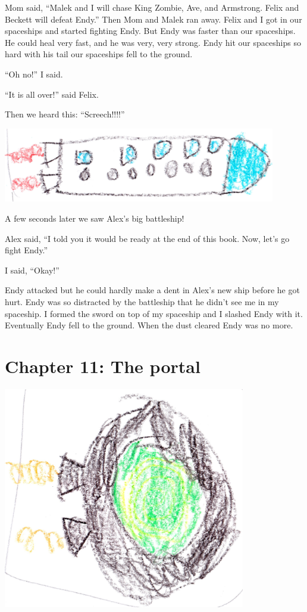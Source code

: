 \documentclass[12pt,oneside]{krantz}
\begin{document}
Mom said, ``Malek and I will chase King Zombie, Ave, and Armstrong.
Felix and Beckett will defeat Endy.'' Then Mom and Malek ran away. Felix
and I got in our spaceships and started fighting Endy. But Endy was
faster than our spaceships. He could heal very fast, and he was very,
very strong. Endy hit our spaceships so hard with his tail our
spaceships fell to the ground.

``Oh no!'' I said.

``It is all over!'' said Felix.

Then we heard this: ``Screech!!!!''

\includegraphics[width=4.6875in,height=\textheight]{img/longrocket.jpg}

A few seconds later we saw Alex's big battleship!

Alex said, ``I told you it would be ready at the end of this book. Now,
let's go fight Endy.''

I said, ``Okay!''

Endy attacked but he could hardly make a dent in Alex's new ship before
he got hurt. Endy was so distracted by the battleship that he didn't see
me in my spaceship. I formed the sword on top of my spaceship and I
slashed Endy with it. Eventually Endy fell to the ground. When the dust
cleared Endy was no more.

\hypertarget{chapter-11-the-portal}{%
\chapter*{Chapter 11: The portal}\label{chapter-11-the-portal}}


\includegraphics[width=4.16667in,height=\textheight]{img/portal.jpg}
\end{document}

